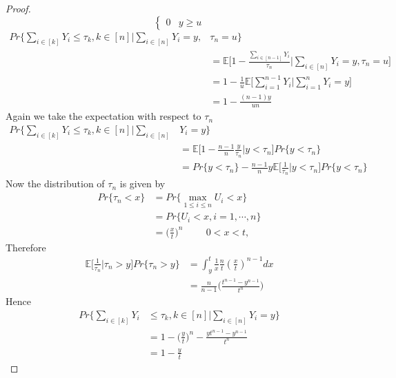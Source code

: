 \documentclass[a4paper,english,12pt]{article}
\begin{document}
\begin{proof}
\begin{equation*}
\begin{cases}
0 &y\geq u
\end{cases}
\end{equation*}
\begin{align*}
	Pr\Bigg\{\sum_{i\in [k]}Y_i \leq \tau_k ,k\in [n] \Big|\sum_{i\in [n]}Y_i=y,& \tau_n=u\Bigg\}\\
&	=\mathbb{E}\Bigg[1-\frac{\sum_{i \in [n-1]}Y_i}{\tau_n} \Big| \sum_{i\in [n]}Y_i=y, \tau_n=u\Bigg]\\
& = 1-\frac{1}{u}\mathbb{E}\Bigg[\sum_{i=1}^{n-1}Y_i \Big| \sum_{i=1}^{n}Y_i=y\Bigg]\\
& = 1-\frac{(n-1)y}{un}
\end{align*}
Again we take the expectation with respect to $\tau_n$
\begin{align*}
		Pr\Bigg\{\sum_{i\in [k]}Y_i \leq \tau_k ,k\in [n] \Big| \sum_{i\in [n]}&Y_i=y\Bigg\}\\
		&= \mathbb{E}\Bigg[1-\frac{n-1}{n}\frac{y}{\tau_n}\Big|y<\tau_n\Bigg]Pr\{y<\tau_n\}\\
		&= Pr\{y<\tau_n\}-\frac{n-1}{n}y\mathbb{E}\Bigg[\frac{1}{\tau_n}\Big| y<\tau_n\Bigg]Pr\{y<\tau_n\}
\end{align*}
Now the distribution of $\tau_n$ is given by
\begin{align*}
	Pr\{\tau_n<x\}&=Pr\Big\{\max\limits_{1 \leq i \leq n}U_i<x\Big\}\\
    &=	Pr\{U_i<x,i=1,\cdots,n\}\\
    &= \Big(\frac{x}{t}\Big)^n \hspace{1cm}0<x<t, 
\end{align*}
Therefore
\begin{align*}
	\mathbb{E}\Bigg[\frac{1}{\tau_n}\Big| \tau_n>y\Bigg]Pr\{\tau_n>y\}&=\int_{y}^{t}\frac{1}{x}\frac{n}{t}(\frac{x}{t})^{n-1}dx\\
	&=\frac{n}{n-1}\Big(\frac{t^{n-1}-y^{n-1}}{t^n}\Big)
\end{align*}
Hence
\begin{align*}
	Pr\Bigg\{\sum_{i\in [k]}Y_i &\leq \tau_k ,k\in [n] \Big| \sum_{i\in [n]}Y_i=y \Bigg\}\\
	&= 1-\Big(\frac{y}{t}\Big)^n-\frac{yt^{n-1}-y^{n-1}}{t^n}\\
	&= 1-\frac{y}{t}
\end{align*}
\end{proof}
\end{document}
